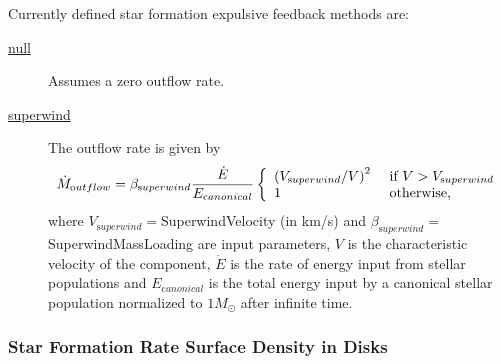 Currently defined star formation expulsive feedback methods are:
\begin{description}
 \item [\hyperlink{star_formation.feedback_expulsion.spheroids.null.F90:star_formation_expulsive_feedback_spheroids_null:star_formation_expulsive_feedback_spheroid_outflow_rate_null}{{\normalfont \ttfamily null}}] Assumes a zero outflow rate.
 \item [\hyperlink{star_formation.feedback_expulsion.spheroids.superwind.F90:star_formation_expulsive_feedback_spheroids_superwind:star_formation_expulsive_feedback_spheroid_outflow_rate_sw}{{\normalfont \ttfamily superwind}}] The outflow rate is given by
\begin{equation}
 \dot{M}_{\mathrm outflow} = \beta_{\mathrm superwind} {\dot{E} \over E_{\mathrm canonical}} \left\{ \begin{array}{ll} \left( V_{\mathrm superwind}/V\right)^2 & \hbox{ if } V > V_{\mathrm superwind} \\ 1 & \hbox{ otherwise,} \end{array} \right.
\end{equation}
where $V_{\mathrm superwind}=${\normalfont {}SuperwindVelocity} (in km/s) and $\beta_{\mathrm superwind}=${\normalfont {}SuperwindMassLoading} are input parameters, $V$ is the characteristic velocity of the component, $\dot{E}$ is the rate of energy input from stellar populations and $E_{\mathrm canonical}$ is the total energy input by a canonical stellar population normalized to $1 M_\odot$ after infinite time.
\end{description}

\subsubsection{Star Formation Rate Surface Density in Disks}

